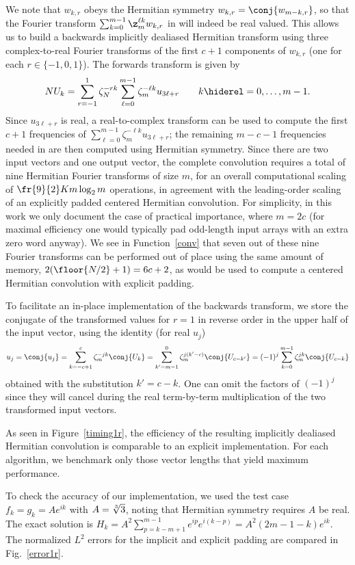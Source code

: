 \documentclass[final]{siamltex}
\def\bel{\begin{dmath}}
\def\eel{\end{dmath}}
\def\no{\hiderel}
\begin{document}
We note that $w_{k,r}$ obeys the Hermitian symmetry 
$w_{k,r}=\conj{w_{m-k,r}}$, so that the Fourier transform
$\sum_{k=0}^{m-1}\z_m^{\ell k} w_{k,r}$ in  will indeed
be real valued. This allows us to build a backwards implicitly dealiased
Hermitian transform using three complex-to-real Fourier transforms of the
first $c+1$ components of $w_{k,r}$ (one for each $r\in\{-1,0,1\}$). The
forwards transform is given by
\bel
NU_k
=\sum_{r=-1}^{1}\zeta_N^{-rk}\sum_{\ell=0}^{m-1}\zeta_m^{-\ell k} u_{3\ell+r}
\qquad k\no =0,\ldots,m-1.\label{fft0forwardsB}
\eel
Since $u_{3\ell+r}$ is real, a real-to-complex transform can be used to
compute the first $c+1$ frequencies of
$\sum_{\ell=0}^{m-1}\zeta_m^{-\ell k} u_{3\ell+r}$; the remaining $m-c-1$
frequencies needed in  are then computed using Hermitian
symmetry. Since there are two input vectors and
one output vector, the complete convolution requires a total of nine
Hermitian Fourier transforms of size $m$, for an overall computational
scaling of $\fr{9}{2}K m \log_2 m$ operations, in agreement with the
leading-order scaling of an explicitly padded centered Hermitian convolution.
For simplicity, in this work we only document the case of practical
importance, where $m=2c$ (for maximal efficiency one would typically pad
odd-length input arrays with an extra zero word anyway). We see in
Function~\ref{conv} that seven out of these nine Fourier transforms can be
performed out of place using the same amount of memory,
$2(\floor{N/2}+1)=6c+2$, as would be used to compute a centered Hermitian
convolution with explicit padding. 

To facilitate an in-place implementation of the
backwards transform, we store the conjugate of the transformed values for
$r=1$ in reverse order in the upper half of the input vector,
using the identity (for real $u_j$)
$$
u_j=\conj{u_j}=\sum_{k=-c+1}^{c}\zeta_m^{-jk} \conj{U_k}
=\sum_{k'=m-1}^{0}\zeta_m^{j(k'-c)} \conj{U_{c-k'}}
=(-1)^j\sum_{k=0}^{m-1}\zeta_m^{jk} \conj{U_{c-k}}
$$
obtained with the substitution $k'=c-k$. One can omit the factors of
$(-1)^j$ since they will cancel during the real term-by-term multiplication
of the two transformed input vectors.

As seen in Figure~\ref{timing1r}, the efficiency of the resulting implicitly
dealiased Hermitian convolution is comparable to an explicit implementation.
For each algorithm, we benchmark only those vector lengths that yield
maximum performance.

To check the accuracy of our implementation, we used the test case
$f_k=g_k=A e^{ik}$ with $A=\root3\of 3$, noting that Hermitian symmetry
requires $A$ be real. The exact solution is 
$H_k=A^2\sum_{p=k-m+1}^{m-1} e^{ip}e^{i(k-p)}=A^2(2m-1-k)e^{ik}$.
The normalized $L^2$ errors for the implicit and explicit padding are compared
in Fig.~\ref{error1r}.
\end{document}
